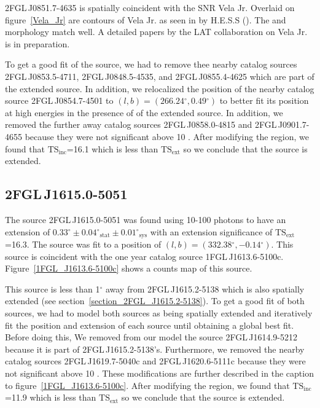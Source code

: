 \documentclass[12pt,preprint]{aastex}
\newcommand{\gev}{\text{GeV}\xspace}
\newcommand{\tev}{\text{TeV}\xspace}
\newcommand{\tsext}{{\ensuremath{\text{TS}_{\text{ext}}}}\xspace}
\newcommand{\tsinc}{\ensuremath{\text{TS}_{\text{inc}}}\xspace}
\newcommand{\sys}{\text{sys}\xspace}
\newcommand{\stat}{\text{stat}\xspace}
\renewcommand{\deg}{\ensuremath{^\circ}\xspace}
\begin{document}
2FGL\,J0851.7-4635 is spatially coincident with the SNR Vela Jr.
Overlaid on figure~\ref{Vela_Jr} are contours of Vela Jr. as seen in
\tev by H.E.S.S (\cite{vela_jr_hess}).  The \gev and \tev morphology
match well.  A detailed papers by the LAT collaboration on Vela Jr. is
in preparation.

To get a good fit of the source, we had to remove thee nearby catalog
sources 2FGL\,J0853.5-4711, 2FGL\,J0848.5-4535, and 2FGL\,J0855.4-4625
which are part of the extended source.  In addition, we relocalized
the position of the nearby catalog source 2FGL\,J0854.7-4501 to
$(l,b)=(266.24\deg,0.49\deg)$ to better fit its position at high energies
in the presence of of the extended source.  In addition, we removed the
further away catalog sources 2FGL\,J0858.0-4815 and 2FGL\,J0901.7-4655
because they were not significant above 10 \gev.  After modifying
the region, we found that \tsinc=16.1 which is less than \tsext so we
conclude that the source is extended. 

\subsection{2FGL\,J1615.0-5051}
\label{section_2FGL_J1615.0-5051}


The source 2FGL\,J1615.0-5051 was found using 10-100 \tev
photons to have an extension of $0.33\deg\pm0.04\deg_\stat\pm0.01\deg_\sys$
with an extension significance of \tsext=16.3.  The source
was fit to a position of $(l,b)=(332.38\deg,-0.14\deg)$.
This source is coincident with the one year catalog source
1FGL\,J1613.6-5100c. Figure~\ref{1FGL_J1613.6-5100c} shows a counts map
of this source.

This source is less than 1\deg away from 2FGL\,J1615.2-5138 which is
also spatially extended (see section~\ref{section_2FGL_J1615.2-5138}).
To get a good fit of both sources, we had to model both sources as
being spatially extended and iteratively fit the position and extension
of each source until obtaining a global best fit.  Before doing this,
We removed from our model the source 2FGL\,J1614.9-5212 because it is
part of 2FGL\,J1615.2-5138's. Furthermore, we removed the nearby catalog
sources 2FGL\,J1619.7-5040c and 2FGL\,J1620.6-5111c because they were not
significant above 10 \gev.  These modifications are further described
in the caption to figure~\ref{1FGL_J1613.6-5100c}.  After modifying
the region, we found that \tsinc=11.9 which is less than \tsext so we
conclude that the source is extended.
\end{document}
